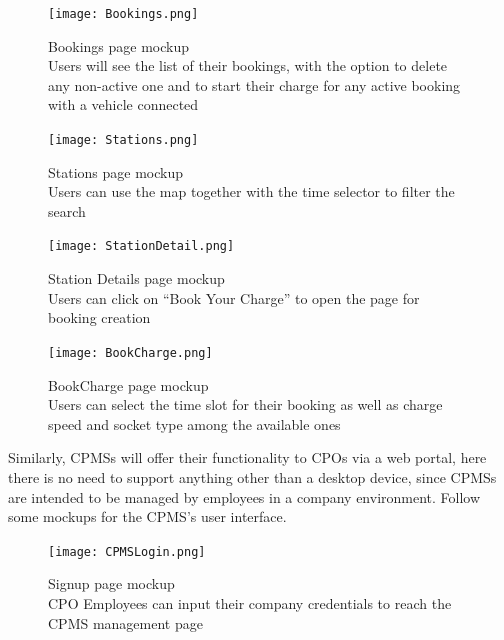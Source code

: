 \documentclass[11pt]{article}
\begin{document}
\newpage

\begin{figure}[!ht]
    \centering
    \texttt{[image: Bookings.png]}
    \captionsetup{justification=centering,margin=2cm}
    \caption{Bookings page mockup \\
    Users will see the list of their bookings, with the option to delete any non-active one and to start their charge for any active booking with a vehicle connected}
    \label{fig:my_label}
\end{figure}

\begin{figure}[!ht]
    \centering
    \texttt{[image: Stations.png]}
    \captionsetup{justification=centering,margin=2cm}
    \caption{Stations page mockup \\
    Users can use the map together with the time selector to filter the search}
    \label{fig:my_label}
\end{figure}

\newpage

\begin{figure}[!ht]
    \centering
    \texttt{[image: StationDetail.png]}
    \captionsetup{justification=centering,margin=2cm}
    \caption{Station Details page mockup \\
    Users can click on “Book Your Charge” to open the page for booking creation}
    \label{fig:my_label}
\end{figure}

\begin{figure}[!ht]
    \centering
    \texttt{[image: BookCharge.png]}
    \captionsetup{justification=centering,margin=2cm}
    \caption{BookCharge page mockup \\
    Users can select the time slot for their booking as well as charge speed and socket type among the available ones}
    \label{fig:my_label}
\end{figure}

Similarly, CPMSs will offer their functionality to CPOs via a web portal, here there is no need to support anything other than a desktop device, since CPMSs are intended to be managed by employees in a company environment. Follow some mockups for the CPMS's user interface.

\begin{figure}[!ht]
    \centering
    \texttt{[image: CPMSLogin.png]}
    \captionsetup{justification=centering,margin=2cm}
    \caption{Signup page mockup \\
    CPO Employees can input their company credentials to reach the CPMS management page}
    \label{fig:my_label}
\end{figure}
\end{document}
